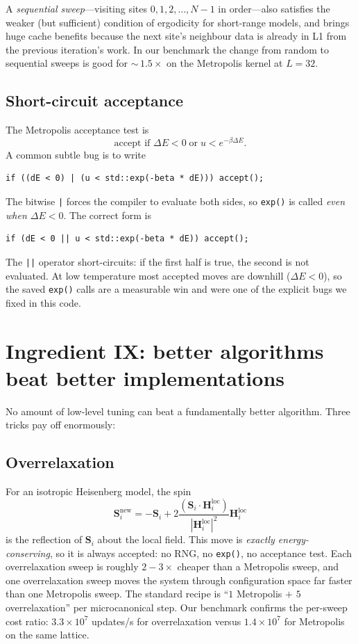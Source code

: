 \documentclass[11pt,letterpaper]{article}
\begin{document}
A \emph{sequential sweep}---visiting sites $0, 1, 2, \dots, N{-}1$
in order---also satisfies the weaker (but sufficient) condition of
ergodicity for short-range models, and brings huge cache benefits because
the next site's neighbour data is already in L1 from the previous
iteration's work.  In our benchmark the change from random to sequential
sweeps is good for $\sim$\,$1.5\times$ on the Metropolis kernel at $L = 32$.

\subsection{Short-circuit acceptance}
The Metropolis acceptance test is
\[
  \text{accept if } \Delta E < 0 \;\text{or}\; u < e^{-\beta \Delta E}.
\]
A common subtle bug is to write
\begin{lstlisting}
if ((dE < 0) | (u < std::exp(-beta * dE))) accept();
\end{lstlisting}
The bitwise \texttt{|} forces the compiler to evaluate both sides, so
\texttt{exp()} is called \emph{even when $\Delta E < 0$}.  The correct
form is
\begin{lstlisting}
if (dE < 0 || u < std::exp(-beta * dE)) accept();
\end{lstlisting}
The \texttt{||} operator short-circuits: if the first half is true, the
second is not evaluated.  At low temperature most accepted moves are
downhill ($\Delta E < 0$), so the saved \texttt{exp()} calls are a
measurable win and were one of the explicit bugs we fixed in this code.

\section{Ingredient IX: better algorithms beat better implementations}

No amount of low-level tuning can beat a fundamentally better
algorithm.  Three tricks pay off enormously:

\subsection{Overrelaxation}
For an isotropic Heisenberg model, the spin
\[
  \mathbf{S}_i^{\text{new}}
  = -\mathbf{S}_i + 2\frac{(\mathbf{S}_i \cdot \mathbf{H}_i^{\text{loc}})}
                          {|\mathbf{H}_i^{\text{loc}}|^2}
                    \mathbf{H}_i^{\text{loc}}
\]
is the reflection of $\mathbf{S}_i$ about the local field.  This move is
\emph{exactly energy-conserving}, so it is always accepted: no RNG, no
\texttt{exp()}, no acceptance test.  Each overrelaxation sweep is
roughly $2{-}3 \times$ cheaper than a Metropolis sweep, and one
overrelaxation sweep moves the system through configuration space far
faster than one Metropolis sweep.  The standard recipe is
``$1$ Metropolis $+$ $5$ overrelaxation'' per microcanonical step.
Our benchmark confirms the per-sweep cost ratio:
$3.3 \times 10^{7}$ updates/s for overrelaxation versus
$1.4 \times 10^{7}$ for Metropolis on the same lattice.
\end{document}
